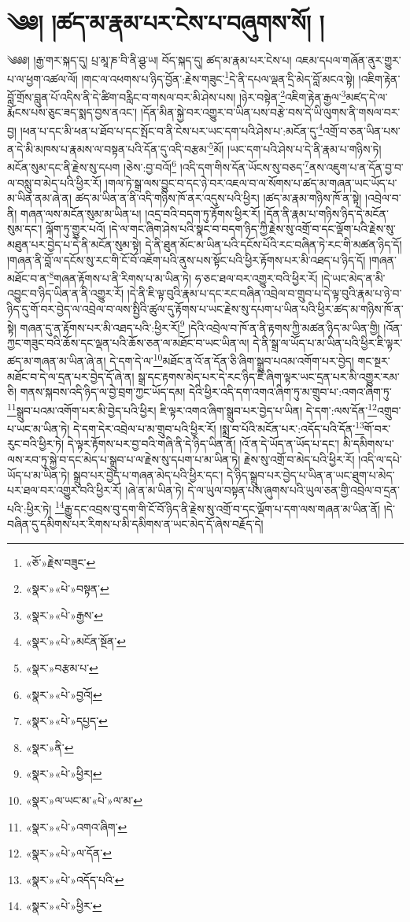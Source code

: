 \chapter{༄༅། །ཚད་མ་རྣམ་པར་ངེས་པ་བཞུགས་སོ། །}༄༅༅། །རྒྱ་གར་སྐད་དུ། པྲ་མཱ་ཎ་བི་ནི་ཤྩ་ཡ། བོད་སྐད་དུ། ཚད་མ་རྣམ་པར་ངེས་པ། འཇམ་དཔལ་གཞོན་ནུར་གྱུར་པ་ལ་ཕྱག་འཚལ་ལོ། །གང་ལ་འཕགས་པ་ཉིད་བྱོན་:རྗེས་གཟུང་\footnote{«ཅོ་»རྗེས་བཟུང་}དེ་ནི་དཔལ་ལྡན་དྲི་མེད་བློ་མངའ་སྟེ། །འཇིག་རྟེན་བློ་གྲོས་བླུན་པོ་འདིས་ནི་དེ་ཚིག་བརླིང་བ་གསལ་བར་མི་ཤེས་པས། །ཉེར་བསྟེན་\footnote{«སྣར་»«པེ་»བསྟན་}འཇིག་རྟེན་རྒྱལ་\footnote{«སྣར་»«པེ་»རྒྱས་}མཛད་དེ་ལ་རྨོངས་པས་ཅུང་ཟད་སྨད་བྱས་ནའང་། །དོན་མིན་སྐྱེ་བར་འགྱུར་བ་ཡིན་པས་བརྩེ་བས་དེ་ཡི་ལུགས་ནི་གསལ་བར་བྱ། །ཕན་པ་དང་མི་ཕན་པ་ཐོབ་པ་དང་སྤོང་བ་ནི་ངེས་པར་ཡང་དག་པའི་ཤེས་པ་:མངོན་དུ་\footnote{«སྣར་»«པེ་»མངོན་སྔོན་}འགྲོ་བ་ཅན་ཡིན་པས་ན་དེ་མི་མཁས་པ་རྣམས་ལ་བསྟན་པའི་དོན་དུ་འདི་བརྩམ་\footnote{«སྣར་»བརྩམ་པ་}མོ། །ཡང་དག་པའི་ཤེས་པ་དེ་ནི་རྣམ་པ་གཉིས་ཏེ། མངོན་སུམ་དང་ནི་རྗེས་སུ་དཔག །ཅེས་:བྱ་བའོ།\footnote{«སྣར་»«པེ་»བྱའོ།} །འདི་དག་གིས་དོན་ཡོངས་སུ་བཅད་\footnote{«སྣར་»«པེ་»དཔྱད་}ནས་འཇུག་པ་ན་དོན་བྱ་བ་ལ་བསླུ་བ་མེད་པའི་ཕྱིར་རོ། །གལ་ཏེ་སྒྲ་ལས་བྱུང་བ་དང་ཉེ་བར་འཇལ་བ་ལ་སོགས་པ་ཚད་མ་གཞན་ཡང་ཡོད་པ་མ་ཡིན་ནམ་ཞེ་ན། ཚད་མ་ཡིན་ན་ནི་འདི་གཉིས་ཁོ་ནར་འདུས་པའི་ཕྱིར། །ཚད་མ་རྣམ་གཉིས་ཁོ་ན་སྟེ། །འབྲེལ་བ་ནི། གཞན་ལས་མངོན་སུམ་མ་ཡིན་པ། །འདྲ་བའི་བདག་ཏུ་རྟོགས་ཕྱིར་རོ། །དོན་ནི་རྣམ་པ་གཉིས་ཉིད་དེ་མངོན་སུམ་དང་། ལྐོག་ཏུ་གྱུར་པའོ། །དེ་ལ་གང་ཞིག་ཤེས་པའི་སྣང་བ་བདག་ཉིད་ཀྱི་རྗེས་སུ་འགྲོ་བ་དང་ལྡོག་པའི་རྗེས་སུ་མཐུན་པར་བྱེད་པ་དེ་ནི་མངོན་སུམ་སྟེ། དེ་ནི་ཐུན་མོང་མ་ཡིན་པའི་དངོས་པོའི་རང་བཞིན་ཏེ་རང་གི་མཚན་ཉིད་དོ། །གཞན་ནི་བློ་ལ་དངོས་སུ་རང་གི་ངོ་བོ་འཇོག་པའི་ནུས་པས་སྟོང་པའི་ཕྱིར་རྟོགས་པར་མི་འཐད་པ་ཉིད་དོ། །གཞན་མཐོང་བ་ན་\footnote{«སྣར་»ནི་}གཞན་རྟོགས་པ་ནི་རིགས་པ་མ་ཡིན་ཏེ། ཧ་ཅང་ཐལ་བར་འགྱུར་བའི་ཕྱིར་རོ། །དེ་ཡང་མེད་ན་མི་འབྱུང་བ་ཉིད་ཡིན་ན་ནི་འགྱུར་རོ། །དེ་ནི་ཇི་ལྟ་བུའི་རྣམ་པ་དང་རང་བཞིན་འབྲེལ་བ་གྲུབ་པ་དེ་ལྟ་བུའི་རྣམ་པ་ཉེ་བ་ཉིད་དུ་གོ་བར་བྱེད་ལ་འབྲེལ་བ་ལས་སྤྱིའི་ཚུལ་དུ་རྟོགས་པ་ཡང་རྗེས་སུ་དཔག་པ་ཡིན་པའི་ཕྱིར་ཚད་མ་གཉིས་ཁོ་ན་སྟེ། གཞན་དུ་ན་རྟོགས་པར་མི་འཐད་པའི་:ཕྱིར་རོ།\footnote{«སྣར་»«པེ་»ཕྱིར།} །དེའི་འབྲེལ་བ་ཁོ་ན་ནི་རྟགས་ཀྱི་མཚན་ཉིད་མ་ཡིན་གྱི། །འོན་ཀྱང་གཟུང་བའི་ཆོས་དང་ལྡན་པའི་ཆོས་ཅན་ལ་མཐོང་བ་ཡང་ཡིན་ལ། དེ་ནི་སྒྲ་ལ་ཡོད་པ་མ་ཡིན་པའི་ཕྱིར་ཇི་ལྟར་ཚད་མ་གཞན་མ་ཡིན་ཞེ་ན། དེ་དག་དེ་ལ་\footnote{«སྣར་»ལ་ཡང་མ་«པེ་»ལ་མ་}མཐོང་ན་འོ་ན་དོན་ཅི་ཞིག་སྒྲུབ་པའམ་འགོག་པར་བྱེད། གང་སྔར་མཐོང་བ་དེ་ལ་དྲན་པར་བྱེད་དོ་ཞེ་ན། སྒྲ་དང་རྟགས་མེད་པར་དེ་རང་ཉིད་ཇི་ཞིག་ལྟར་ཡང་དྲན་པར་མི་འགྱུར་རམ་ཅི། གནས་སྐབས་འདི་ཉིད་ལ་བྱེ་བྲག་ཀྱང་ཡོད་དམ། དེའི་ཕྱིར་འདི་དག་འགའ་ཞིག་ཏུ་མ་གྲུབ་པ་:འགའ་ཞིག་ཏུ་\footnote{«སྣར་»«པེ་»འགའ་ཞིག་}སྒྲུབ་པའམ་འགོག་པར་མི་བྱེད་པའི་ཕྱིར། ཇི་ལྟར་འགའ་ཞིག་སྒྲུབ་པར་བྱེད་པ་ཡིན། དེ་དག་:ལས་དོན་\footnote{«སྣར་»«པེ་»ལ་དོན་}འགྲུབ་པ་ཡང་མ་ཡིན་ཏེ། དེ་དག་དེར་འབྲེལ་པ་མ་གྲུབ་པའི་ཕྱིར་རོ། །སྨྲ་བ་པོའི་མངོན་པར་:འདོད་པའི་དོན་\footnote{«སྣར་»«པེ་»འདོད་པའི་}གོ་བར་རུང་བའི་ཕྱིར་ཏེ། དེ་ལྟར་རྟོགས་པར་བྱ་བའི་གཞི་ནི་དེ་ཉིད་ཡིན་ནོ། །འོ་ན་དེ་ཡོད་ན་ཡོད་པ་དང་། མི་དམིགས་པ་ལས་རབ་ཏུ་སྐྱེ་བ་དང་མེད་པ་སྒྲུབ་པ་ལ་རྗེས་སུ་དཔག་པ་མ་ཡིན་ཏེ། རྗེས་སུ་འགྲོ་བ་མེད་པའི་ཕྱིར་རོ། །འདི་ལ་དཔེ་ཡོད་པ་མ་ཡིན་ཏེ། སྒྲུབ་པར་བྱེད་པ་གཞན་མེད་པའི་ཕྱིར་དང་། དེ་ཉིད་སྒྲུབ་པར་བྱེད་པ་ཡིན་ན་ཡང་ཐུག་པ་མེད་པར་ཐལ་བར་འགྱུར་བའི་ཕྱིར་རོ། །ཞེ་ན་མ་ཡིན་ཏེ། དེ་ལ་ཡུལ་བསྟན་པས་ཞུགས་པའི་ཡུལ་ཅན་གྱི་འབྲེལ་བ་དྲན་པའི་:ཕྱིར་ཏེ། \footnote{«སྣར་»«པེ་»ཕྱིར་}རྒྱུ་དང་འབྲས་བུ་དག་གི་ངོ་བོ་ཉིད་ནི་རྗེས་སུ་འགྲོ་བ་དང་ལྡོག་པ་དག་ལས་གཞན་མ་ཡིན་ནོ། །དེ་བཞིན་དུ་དམིགས་པར་རིགས་པ་མི་དམིགས་ན་ཡང་མེད་དོ་ཞེས་བརྗོད་དེ། 